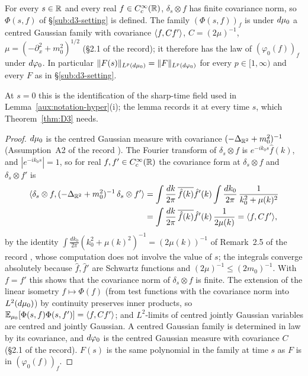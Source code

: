 \begin{auxlemma}\label{aux:d3-sharp}
For every $s\in\mathbb{R}$ and every real $f\in C_c^\infty(\mathbb{R})$, $\delta_s\otimes f$ has finite
covariance norm, so $\Phi(s,f)$ of \S\ref{sub:d3-setting} is defined.  The family
$(\Phi(s,f))_f$ is under $d\mu_0$ a centred Gaussian family with covariance $\langle f,Cf'\rangle$,
$C=(2\mu)^{-1}$, $\mu=(-\partial_x^2+m_0^2)^{1/2}$ (\S2.1 of the record); it therefore has the law
of $(\varphi_0(f))_f$ under $d\varphi_0$.  In particular $\|F(s)\|_{L^p(d\mu_0)}=\|F\|_{L^p(d\varphi_0)}$ for
every $p\in[1,\infty)$ and every $F$ as in \S\ref{sub:d3-setting}.
\end{auxlemma}

At $s=0$ this is the identification of the sharp-time field used in
Lemma~\ref{aux:notation-hyper}(i); the lemma records it at every time $s$, which
Theorem~\ref{thm:D3} needs.

\begin{proof}
$d\mu_0$ is the centred Gaussian measure with covariance $(-\Delta_{\mathbb{R}^2}+m_0^2)^{-1}$
(Assumption~A2 of the record \cite[p.~8]{R}).  The Fourier transform of $\delta_s\otimes f$ is
$e^{-ik_0s}\hat f(k)$, and $|e^{-ik_0s}|=1$, so for real $f,f'\in C_c^\infty(\mathbb{R})$ the covariance
form at $\delta_s\otimes f$ and $\delta_s\otimes f'$ is
\begin{align*}
 \langle \delta_s\otimes f,(-\Delta_{\mathbb{R}^2}+m_0^2)^{-1}\,\delta_s\otimes f'\rangle
 &=\int\frac{dk}{2\pi}\,\overline{\hat f(k)}\hat f'(k)\int\frac{dk_0}{2\pi}\,
 \frac1{k_0^2+\mu(k)^2}\\
 &=\int\frac{dk}{2\pi}\,\overline{\hat f(k)}\hat f'(k)\,\frac1{2\mu(k)}=\langle f,Cf'\rangle ,
\end{align*}
by the identity $\int\frac{dk_0}{2\pi}(k_0^2+\mu(k)^2)^{-1}=(2\mu(k))^{-1}$ of Remark~2.5 of the
record \cite[p.~14]{R}, whose computation does not involve the value of $s$; the integrals converge
absolutely because $\hat f,\hat f'$ are Schwartz functions and $(2\mu)^{-1}\le(2m_0)^{-1}$.  With
$f=f'$ this shows that the covariance norm of $\delta_s\otimes f$ is finite.  The extension of the
linear isometry $f\mapsto\Phi(f)$ (from test functions with the covariance norm into $L^2(d\mu_0)$)
by continuity preserves inner products, so $\mathbb{E}_{\mu_0}[\Phi(s,f)\Phi(s,f')]=\langle f,Cf'\rangle$; and
$L^2$-limits of centred jointly Gaussian variables are centred and jointly Gaussian.  A centred
Gaussian family is determined in law by its covariance, and $d\varphi_0$ is the centred Gaussian measure
with covariance $C$ (\S2.1 of the record).  $F(s)$ is the same polynomial in the family at time $s$
as $F$ is in $(\varphi_0(f))_f$.
\end{proof}

